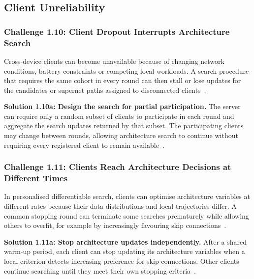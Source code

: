 \subsection{Client Unreliability}

\subsubsection{Challenge 1.10: Client Dropout Interrupts Architecture Search}

Cross-device clients can become unavailable because of changing network conditions, battery constraints or competing local workloads. A search procedure that requires the same cohort in every round can then stall or lose updates for the candidates or supernet paths assigned to disconnected clients~\cite{optimize_fednas_edge_2021}.

\noindent\textbf{Solution 1.10a: Design the search for partial participation.} The server can require only a random subset of clients to participate in each round and aggregate the search updates returned by that subset. The participating clients may change between rounds, allowing architecture search to continue without requiring every registered client to remain available~\cite{optimize_fednas_edge_2021}.

\subsubsection{Challenge 1.11: Clients Reach Architecture Decisions at Different Times}

In personalised differentiable search, clients can optimise architecture variables at different rates because their data distributions and local trajectories differ. A common stopping round can terminate some searches prematurely while allowing others to overfit, for example by increasingly favouring skip connections~\cite{collaborative_nas_for_pfl_2025}.

\noindent\textbf{Solution 1.11a: Stop architecture updates independently.} After a shared warm-up period, each client can stop updating its architecture variables when a local criterion detects increasing preference for skip connections. Other clients continue searching until they meet their own stopping criteria~\cite{collaborative_nas_for_pfl_2025}.

